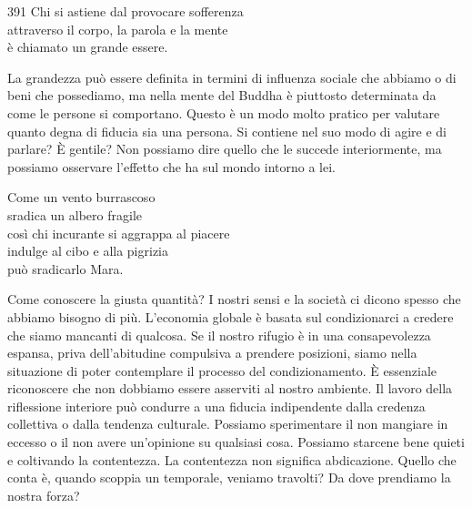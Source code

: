 
\begin{dhpVerse}{391}
\label{dhp-391}
Chi si astiene dal provocare sofferenza\\
attraverso il corpo, la parola e la mente\\
è chiamato un grande essere.
\end{dhpVerse}

\begin{dhpRefl}
  La grandezza può essere definita in termini di influenza sociale che abbiamo o
  di beni che possediamo, ma nella mente del Buddha è piuttosto determinata da
  come le persone si comportano. Questo è un modo molto pratico per valutare
  quanto degna di fiducia sia una persona. Si contiene nel suo modo di agire e
  di parlare? È gentile? Non possiamo dire quello che le succede interiormente,
  ma possiamo osservare l'effetto che ha sul mondo intorno a lei.
\end{dhpRefl}


\begin{dhpVerse}{7}
\label{dhp-7}
Come un vento burrascoso\\
sradica un albero fragile\\
così chi incurante si aggrappa al piacere\\
indulge al cibo e alla pigrizia\\
può sradicarlo Mara.
\end{dhpVerse}

\begin{dhpRefl}
  Come conoscere la giusta quantità? I nostri sensi e la società ci dicono
  spesso che abbiamo bisogno di più. L'economia globale è basata sul
  condizionarci a credere che siamo mancanti di qualcosa. Se il nostro rifugio è
  in una consapevolezza espansa, priva dell'abitudine compulsiva a prendere
  posizioni, siamo nella situazione di poter contemplare il processo del
  condizionamento. È essenziale riconoscere che non dobbiamo essere asserviti al
  nostro ambiente. Il lavoro della riflessione interiore può condurre a una
  fiducia indipendente dalla credenza collettiva o dalla tendenza culturale.
  Possiamo sperimentare il non mangiare in eccesso o il non avere un'opinione su
  qualsiasi cosa. Possiamo starcene bene quieti e coltivando la contentezza. La
  contentezza non significa abdicazione. Quello che conta è, quando scoppia un
  temporale, veniamo travolti? Da dove prendiamo la nostra forza?
\end{dhpRefl}

